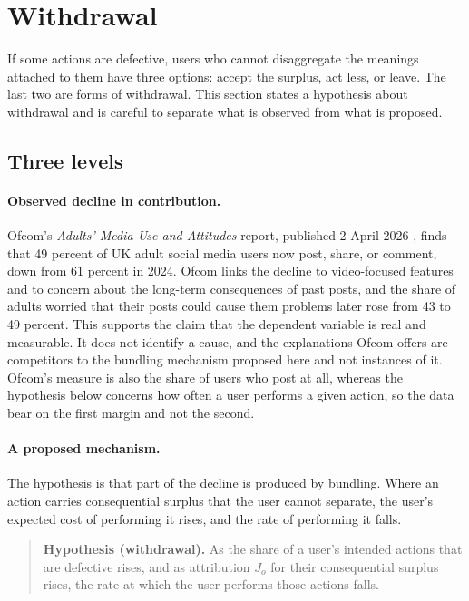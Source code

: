 
\section{Withdrawal}\label{sec:withdrawal}

If some actions are defective, users who cannot disaggregate the meanings attached to them have three options: accept the surplus, act less, or leave. The last two are forms of withdrawal. This section states a hypothesis about withdrawal and is careful to separate what is observed from what is proposed.

\subsection{Three levels}

\paragraph{Observed decline in contribution.} Ofcom's \emph{Adults' Media Use and Attitudes} report, published 2 April 2026 \cite{ofcom2026}, finds that 49 percent of UK adult social media users now post, share, or comment, down from 61 percent in 2024. Ofcom links the decline to video-focused features and to concern about the long-term consequences of past posts, and the share of adults worried that their posts could cause them problems later rose from 43 to 49 percent. This supports the claim that the dependent variable is real and measurable. It does not identify a cause, and the explanations Ofcom offers are competitors to the bundling mechanism proposed here and not instances of it. Ofcom's measure is also the share of users who post at all, whereas the hypothesis below concerns how often a user performs a given action, so the data bear on the first margin and not the second.

\paragraph{A proposed mechanism.} The hypothesis is that part of the decline is produced by bundling. Where an action carries consequential surplus that the user cannot separate, the user's expected cost of performing it rises, and the rate of performing it falls.

\begin{quote}
\textbf{Hypothesis (withdrawal).} As the share of a user's intended actions that are defective rises, and as attribution $J_o$ for their consequential surplus rises, the rate at which the user performs those actions falls.
\end{quote}

